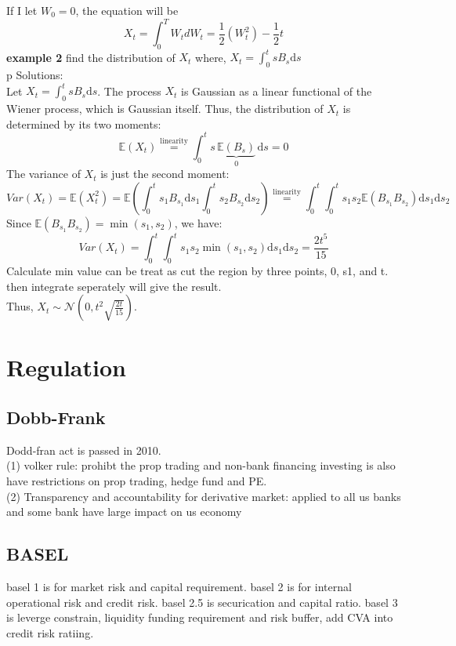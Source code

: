 \documentclass[a4paper,11pt]{article}
\begin{document}
If I let $W_0=0$, the equation will be
$$X_t= \int_0^T W_tdW_t=\frac{1}{2}(W_t^2)-\frac{1}{2}t$$
{\bf example 2}
find the distribution of $X_t$ where, $X_t=\int_0^t sB_s\mathrm{d}s$\\p
Solutions:\\
Let $X_t = \int_0^t s B_s \mathrm{d}s$. The process $X_t$ is Gaussian as a linear functional of the Wiener process, which is Gaussian itself. Thus, the distribution of $X_t$ is determined by its two moments:
$$
    \mathbb{E}\left(X_t\right) \stackrel{\text{linearity}}{=} \int_0^t s \, \underbrace{\mathbb{E}\left(B_s\right)}_0 \, \mathrm{d}s  = 0
$$
The variance of $X_t$ is just the second moment:
$$
   Var(X_t)= \mathbb{E}\left(X_t^2\right) = \mathbb{E}\left( \int_0^t s_1 B_{s_1} \mathrm{d}s_1  \int_0^t s_2 B_{s_2} \mathrm{d}s_2 \right)  \stackrel{\text{linearity}}{=} \int_0^t \int_0^t s_1 s_2 \mathbb{E}\left(B_{s_1} B_{s_2}\right) \mathrm{d}s_1 \mathrm{d}s_2
$$
Since $\mathbb{E}\left(B_{s_1} B_{s_2}\right) = \min(s_1, s_2)$, we have:
$$
  Var(X_t)= \int_0^t \int_0^t s_1 s_2 \min(s_1, s_2) \mathrm{d}s_1 \mathrm{d}s_2 = \frac{2 t^5}{15}
$$
Calculate min value can be treat as cut the region by three points, 0, s1, and t. then integrate seperately will give the result.\\
Thus, $X_t \sim \mathcal{N}\left(0, t^2 \sqrt{\frac{2 t}{15}} \right)$.
\section{Regulation}
\subsection{Dobb-Frank}
Dodd-fran act is passed in 2010.\\
(1) volker rule: prohibt the prop trading and non-bank financing investing is also have restrictions on prop trading, hedge fund and PE. \\
(2) Transparency and accountability for derivative market: applied to all us banks and some bank have large impact on us economy\\
\subsection{BASEL}
basel 1 is for market risk and capital requirement. basel 2 is for internal operational risk and credit risk. basel 2.5 is securication and capital ratio. basel 3 is leverge constrain, liquidity funding requirement and risk buffer, add CVA into credit risk ratiing.
\end{document}
